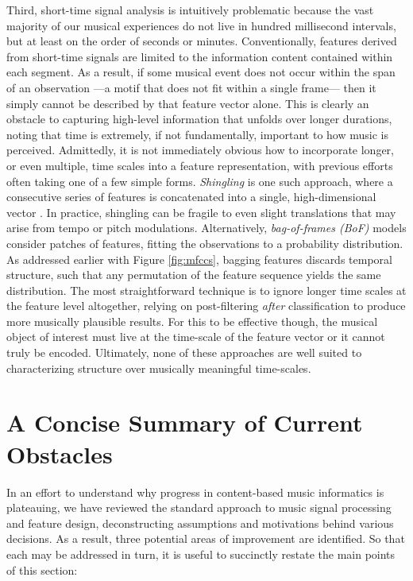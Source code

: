 Third, short-time signal analysis is intuitively problematic because the vast majority of our musical experiences do not live in hundred millisecond intervals, but at least on the order of seconds or minutes.
Conventionally, features derived from short-time signals are limited to the information content contained within each segment.
As a result, if some musical event does not occur within the span of an observation ---a motif that does not fit within a single frame--- then it simply cannot be described by that feature vector alone.
This is clearly an obstacle to capturing high-level information that unfolds over longer durations, noting that time is extremely, if not fundamentally, important to how music is perceived.
Admittedly, it is not immediately obvious how to incorporate longer, or even multiple, time scales into a feature representation, with previous efforts often taking one of a few simple forms.
\emph{Shingling} is one such approach, where a consecutive series of features is concatenated into a single, high-dimensional vector \cite{Casey2008}.
In practice, shingling can be fragile to even slight translations that may arise from tempo or pitch modulations.
Alternatively, \emph{bag-of-frames (BoF)} models consider patches of features, fitting the observations to a probability distribution.
As addressed earlier with Figure \ref{fig:mfccs}, bagging features discards temporal structure, such that any permutation of the feature sequence yields the same distribution.
The most straightforward technique is to ignore longer time scales at the feature level altogether, relying on post-filtering \emph{after} classification to produce more musically plausible results.
For this to be effective though, the musical object of interest must live at the time-scale of the feature vector or it cannot truly be encoded.
Ultimately, none of these approaches are well suited to characterizing structure over musically meaningful time-scales.



\section{A Concise Summary of Current Obstacles}
\label{sec:obstacles}
In an effort to understand why progress in content-based music informatics is plateauing, we have reviewed the standard approach to music signal processing and feature design, deconstructing assumptions and motivations behind various decisions.
As a result, three potential areas of improvement are identified.
So that each may be addressed in turn, it is useful to succinctly restate the main points of this section:

